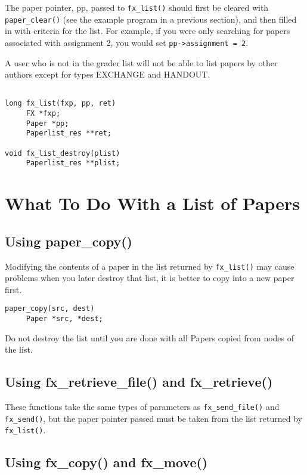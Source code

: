 The paper pointer, pp, passed to \verb+fx_list()+ should first be
cleared with \verb+paper_clear()+ (see the example program in a previous
section), and then filled in with criteria for the list.  For example,
if you were only searching for papers associated with assignment 2, you
would set \verb+pp->assignment = 2+.

A user who is not in the grader list will not be able to list papers by
other authors except for types EXCHANGE and HANDOUT.

\begin{verbatim}

long fx_list(fxp, pp, ret)
     FX *fxp;
     Paper *pp;
     Paperlist_res **ret;

void fx_list_destroy(plist)
     Paperlist_res **plist;

\end{verbatim}

\section{What To Do With a List of Papers}

\subsection{Using paper\_copy()}

Modifying the contents of a paper in the list returned by
\verb+fx_list()+ may cause problems when you later destroy that list,
it is better to copy into a new paper first.

\begin{verbatim}
paper_copy(src, dest)
     Paper *src, *dest;
\end{verbatim}

Do not destroy the list until you are done with all Papers copied from
nodes of the list.

\subsection{Using fx\_retrieve\_file() and fx\_retrieve()}

These functions take the same types of parameters as
\verb+fx_send_file()+ and \verb+fx_send()+, but the paper pointer
passed must be taken from the list returned by \verb+fx_list()+.

\subsection{Using fx\_copy() and fx\_move()}

